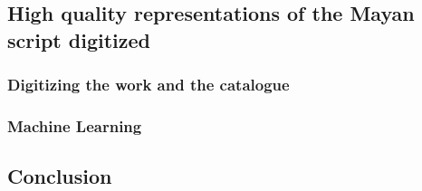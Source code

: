 \documentclass[11pt]{article}
\begin{document}
\subsection{High quality representations of the Mayan script digitized}
\label{sec-1-3}

\subsubsection{Digitizing the work and the catalogue}
\label{sec-1-3-1}

\subsubsection{Machine Learning}
\label{sec-1-3-2}

\subsection{Conclusion}
\label{sec-1-4}



\end{document}
